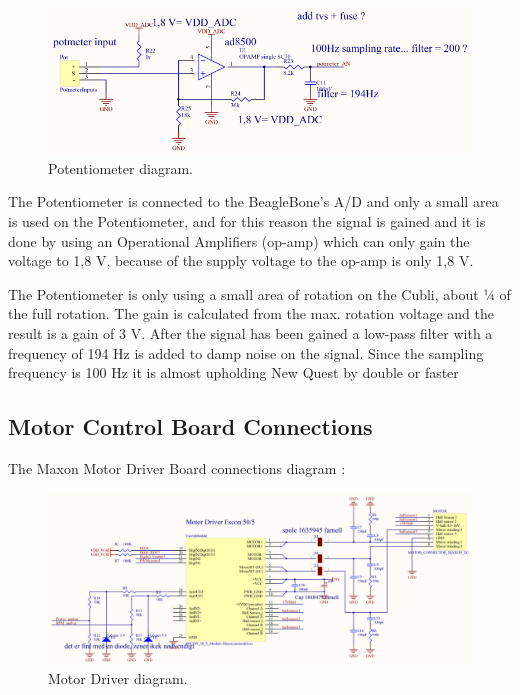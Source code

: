 \begin{figure}[H]
	\centering
	\includegraphics[scale=0.92]{figures/Potmeter.pdf}
	\caption{Potentiometer diagram.}
	\label{labPotmeter}
\end{figure}\vspace{-5mm}

The Potentiometer is connected to the BeagleBone’s A/D and only a small area is used on the Potentiometer, and for this reason the signal is gained and it is done by using an Operational Amplifiers (op-amp) which can only gain the voltage to 1,8 V, because of the supply voltage to the op-amp is only 1,8 V.

The Potentiometer is only using a small area of rotation on the Cubli, about ¼ of the full rotation. The gain is calculated from the max. rotation voltage and the result is a gain of 3 V. After the signal has been gained a low-pass filter with a frequency of 194 Hz is added to damp noise on the signal. Since the sampling frequency is 100 Hz it is almost upholding New Quest by double or faster

\subsection{Motor Control Board Connections}
The Maxon Motor Driver Board connections diagram :\\

\begin{figure}[H]
	\centering
	\includegraphics[scale=0.92]{figures/MotorDriver.pdf}
	\caption{Motor Driver diagram.}
	\label{labMotorDriver}
\end{figure}\vspace{-5mm}

